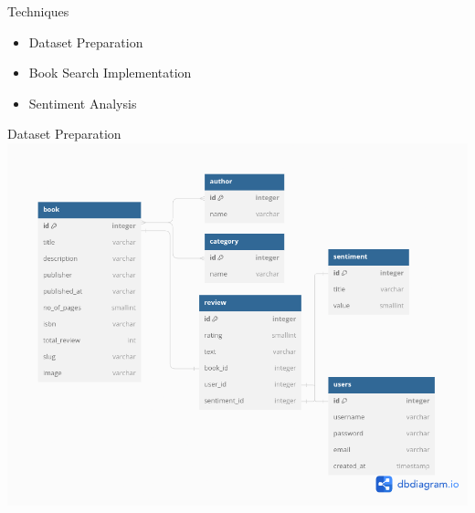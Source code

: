 \documentclass{beamer}
\begin{document}
	\begin{frame}{Techniques}
		\begin{itemize}
			\item Dataset Preparation
				\vspace{0.5cm}
			\item Book Search Implementation
				\vspace{0.5cm}
			\item Sentiment Analysis
		\end{itemize}
	\end{frame}
	
\begin{frame}{Dataset Preparation}
	\includegraphics[width=\textwidth]{schema.png}
\end{frame}
	
\end{document}
